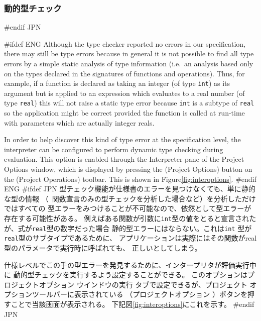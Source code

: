 \documentclass[\pformat,12pt]{article}
\newcommand{\aaa}{\tt }
\newcommand{\guicmd}[1]{{\sf #1}}
\newcommand{\guicmd}[1]{{\gt #1}}
\begin{document}
\subsubsection{動的型チェック}
#endif JPN

#ifdef ENG
Although the type checker reported no errors in our specification,
there may still be type errors because in general it is not possible
to find all type errors by a simple static analysis of type
information (i.e.\ an analysis based only on the types declared in the
signatures of functions and operations). Thus, for example, if a
function is declared as taking an integer (of type {\aaa int}) as its
argument but is applied to an expression which evaluates to a real
number (of type {\aaa real}) this will not raise a static type error
because {\aaa int} is a subtype of {\aaa real} so the application
might be correct provided the function is called at run-time with
parameters which are actually integer reals.

In order to help discover this kind of type error at the specification
level, the interpreter can be configured to perform dynamic type
checking during evaluation.  This option is enabled through the
\guicmd{Interpreter} pane of the \guicmd{Project Options} window, 
which is displayed by pressing the
(\guicmd{Project Options}) button on the (\guicmd{Project Operations})
toolbar. This is shown in Figure\ref{fig:interoptions}.
#endif ENG
#ifdef JPN
型チェック機能が仕様書のエラーを見つけなくても、単に静的な型の情報
（\ 関数宣言のみの型チェックを分析した場合など）を分析しただけではすべての
型エラーをみつけることが不可能なので、依然として型エラーが存在する可能性がある。
例えばある関数が引数に{\aaa int}型の値をとると宣言されたが、式が{\aaa real}型の数字だった場合
静的型エラーにはならない。これは{\aaa int} 型が{\aaa real}型のサブタイプであるために、
アプリケーションは実際にはその関数がreal型のパラメータで実行時に呼ばれても、
正しいとしてしまう。

仕様レベルでこの手の型エラーを発見するために、インタープリタが評価実行中に
動的型チェックを実行するよう設定することができる。
このオプションは\guicmd{プロジェクトオプション} ウインドウの\guicmd{実行} タブで設定できるが、プロジェクト
オプションツールバーに表示されている 
 （\guicmd{プロジェクトオプション} ）ボタンを押すことで当該画面が表示される。
下記図\ref{fig:interoptions}にこれを示す。
#endif JPN
\end{document}
